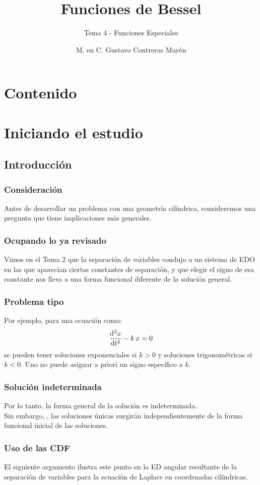 \documentclass[12pt]{beamer}
\date{}
\title{\large{Funciones de Bessel}}
\subtitle{Tema 4 - Funciones Especiales}
\author{M. en C. Gustavo Contreras Mayén}
\begin{document}
\maketitle
\fontsize{14}{14}\selectfont
{}

\section*{Contenido}

\section{Iniciando el estudio}
\subsection{Introducción}

\begin{frame} 
\frametitle{Consideración}
Antes de desarrollar un problema con una geometría cilíndrica, consideremos una pregunta que tiene implicaciones más generales.
\end{frame}
\begin{frame}
\frametitle{Ocupando lo ya revisado}
Vimos en el Tema 2 que la separación de variables condujo a un sistema de EDO en las que aparecían ciertas constantes de separación, y que elegir el signo de esa constante nos lleva a una forma funcional diferente de la solución general.
\end{frame}
\begin{frame}
\frametitle{Problema tipo}
Por ejemplo, para una ecuación como:
\pause
\begin{align*}
\dv[2]{x}{t} - k \, x = 0
\end{align*}
\pause
se pueden tener soluciones exponenciales si $k > 0$ y soluciones trigonométricas si $k < 0$. Uno no puede asignar a priori un signo específico a $k$.
\end{frame}
\begin{frame}
\frametitle{Solución indeterminada}
Por lo tanto, la forma general de la solución es indeterminada. 
\\
\bigskip
\pause
Sin embargo, , las soluciones únicas surgirán independientemente de la forma funcional inicial de las soluciones.
\end{frame}
\begin{frame}
\frametitle{Uso de las CDF}
El siguiente argumento ilustra este punto en la ED angular resultante de la separación de variables para la ecuación de Laplace en coordenadas cilíndricas.
\end{frame}
\end{document}
